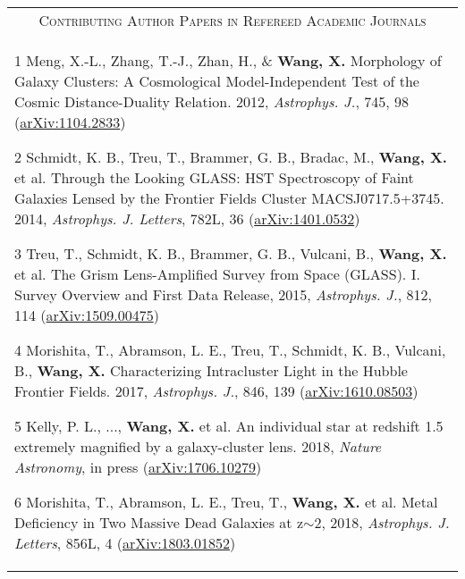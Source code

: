 \documentclass[letterpaper,10pt]{article}
\begin{document}
\begin{longtable}{p{6in}}
\multicolumn{1}{c}{\textsc{Contributing Author Papers in Refereed Academic Journals}}      \\
\vspace{-1em}
\begin{list}{}{\leftmargin=0.5em}
    \item[1]\hypertarget{12.meng.apj}{} Meng, X.-L., Zhang, T.-J., Zhan, H., \& \textbf{Wang, X.} Morphology of Galaxy Clusters: A Cosmological Model-Independent Test of the Cosmic Distance-Duality Relation. 2012, \textit{Astrophys. J.}, 745, 98 (\href{http://arxiv.org/abs/1104.2833}{arXiv:1104.2833})
    \item[2]\hypertarget{14.schmidt.apjl}{} Schmidt, K. B., Treu, T., Brammer, G. B., Bradac, M., \textbf{Wang, X.} et al. Through the Looking GLASS: HST Spectroscopy of Faint Galaxies Lensed by the Frontier Fields Cluster MACSJ0717.5+3745. 2014, \textit{Astrophys. J. Letters}, 782L, 36 (\href{http://arxiv.org/abs/1401.0532}{arXiv:1401.0532})
    \item[3]\hypertarget{}{} Treu, T., Schmidt, K. B., Brammer, G. B., Vulcani, B., \textbf{Wang, X.} et al. The Grism
    Lens-Amplified Survey from Space (GLASS). I. Survey Overview and First Data Release, 2015, \textit{Astrophys. J.}, 812, 114
    (\href{https://arxiv.org/abs/1509.00475}{arXiv:1509.00475})
    \item[4]\hypertarget{}{} Morishita, T., Abramson, L. E., Treu, T., Schmidt, K. B., Vulcani, B., \textbf{Wang, X.}
    Characterizing Intracluster Light in the Hubble Frontier Fields. 2017, \textit{Astrophys. J.}, 846, 139
    (\href{https://arxiv.org/abs/1610.08503}{arXiv:1610.08503})
    \item[5]\hypertarget{}{} Kelly, P. L., ..., \textbf{Wang, X.} et al. An individual star at redshift 1.5 extremely magnified by
    a galaxy-cluster lens. 2018, \textit{Nature Astronomy}, in press (\href{https://arxiv.org/abs/1706.10279}{arXiv:1706.10279})
    \item[6]\hypertarget{}{} Morishita, T., Abramson, L. E., Treu, T., \textbf{Wang, X.} et al.  Metal Deficiency in Two Massive Dead
    Galaxies at z$\sim$2, 2018, \textit{Astrophys. J. Letters}, 856L, 4 (\href{https://arxiv.org/abs/1803.01852}{arXiv:1803.01852})
\end{list}

\end{longtable}


\vspace{-2.5em}
\end{document}
